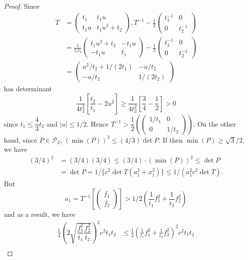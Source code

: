 \begin{proof}
Since\pageoriginale
\begin{align*}
T &= 
\begin{pmatrix}
t_{1} & t_{1}u\\
t_{1}u & t_{1}u^{2}+t_{2}
\end{pmatrix}
, T^{-1}-\frac{1}{2}
\begin{pmatrix}
t^{-1}_{1} & 0\\
0 &  t^{-1}_{2}
\end{pmatrix}\\
& =\frac{1}{t_{1}t_{2}}
\begin{pmatrix}
t_{1}u^{2}+t_{2} & -t_{1}u\\
-t_{1}u & t_{1}
\end{pmatrix}
-\frac{1}{2}
\begin{pmatrix}
t^{-1}_{1} & 0\\
0 & t^{-1}_{2}
\end{pmatrix}\\
&= 
\begin{pmatrix}
u^{2}/t_{2}+1/(2t_{1}) & -u/t_{2}\\
-u/t_{2} & 1/(2t_{2})
\end{pmatrix}
\end{align*}
has determinant
$$
\frac{1}{4t^{2}_{2}}\left[\frac{t_{2}}{t_{1}}-2u^{2}\right]\geq
\frac{1}{4t^{2}_{2}}\left[\frac{3}{4}-\frac{1}{2}\right]>0 
$$
since $t_{1}\leq \dfrac{4}{3}t_{2}$ and $|u|\leq 1/2$. Hence
$T^{-1}>\dfrac{1}{2}
\left(\begin{pmatrix}
1/t_{1} & 0\\
0 &  1/t_{2}
\end{pmatrix}\right)$. On the other hand, since $P\in
\mathscr{P}_{2}$, $(\min (P))^{2}\leq (4/3)\det P$. If then
$\min(P)\geq \sqrt{3}/2$, we have
\begin{align*}
(3/4)^{2} &= (3/4)(3/4)\leq (3/4)\cdot (\min (P))^{2}\leq \det P\\
 &= \det P=1/\{c^{2}\det T(a^{2}_{1}+x^{2}_{1})\}\leq
  1/(a^{2}_{1}c^{2}\det T).
\end{align*}
But 
$$
a_{1}=T^{-1}
\left[
\begin{pmatrix}
f_{1}\\
f_{2}
\end{pmatrix}
\right]>1/2\left(\frac{1}{t_{1}}f^{2}_{1}+\frac{1}{t_{2}}f^{2}_{2}\right)
$$
and as a result, we have
\begin{align*}
\frac{1}{4}\left(2\sqrt{\dfrac{f^{2}_{1}}{t_{1}}\dfrac{f^{2}_{2}}{t_{2}}}\right)^{2}c^{2}t_{1}t_{2}
&\leq
\frac{1}{4}\left(\frac{1}{t_{1}}f^{2}_{1}+\frac{1}{t_{2}}f^{2}_{2}\right)^{2}c^{2}t_{1}t_{2}\tag{45}\label{c1:eq45}\\

\end{align*}
\end{proof}
